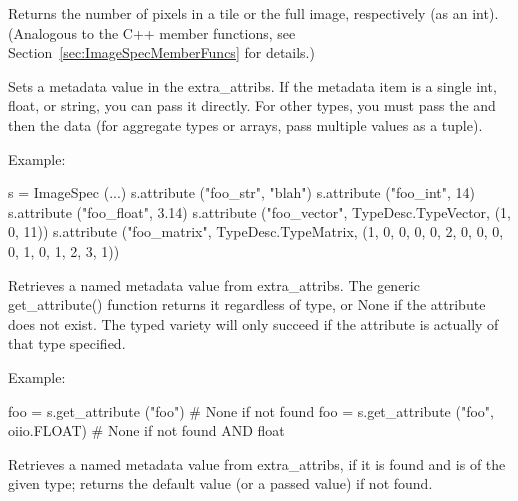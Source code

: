 Returns the number of pixels in a tile or the full image, respectively
(as an {\cf int}). (Analogous to the C++ member functions, see 
Section~\ref{sec:ImageSpecMemberFuncs} for details.)
\apiend

Sets a metadata value in the {\cf extra_attribs}.  If the metadata item
is a single {\cf int}, {\cf float}, or {\cf string}, you can pass it
directly. For other types, you must pass the \TypeDesc and then the
data (for aggregate types or arrays, pass multiple values as a tuple).

\noindent Example:
\begin{code}
    s = ImageSpec (...)
    s.attribute ("foo_str", "blah")
    s.attribute ("foo_int", 14)
    s.attribute ("foo_float", 3.14)
    s.attribute ("foo_vector", TypeDesc.TypeVector, (1, 0, 11))
    s.attribute ("foo_matrix", TypeDesc.TypeMatrix,
                 (1, 0, 0, 0, 0, 2, 0, 0, 0, 0, 1, 0, 1, 2, 3, 1))
\end{code}
\apiend

Retrieves a named metadata value from {\cf extra_attribs}.  The generic
{\cf get_attribute()} function returns it regardless of type, or {\cf None}
if the attribute does not exist.  The typed variety will only succeed
if the attribute is actually of that type specified.

\noindent Example:
\begin{code}
    foo = s.get_attribute ("foo")   # None if not found
    foo = s.get_attribute ("foo", oiio.FLOAT)  # None if not found AND float
\end{code}
\apiend

Retrieves a named metadata value from {\cf extra_attribs}, if it is
found and is of the given type; returns the default value (or a passed
value) if not found.

